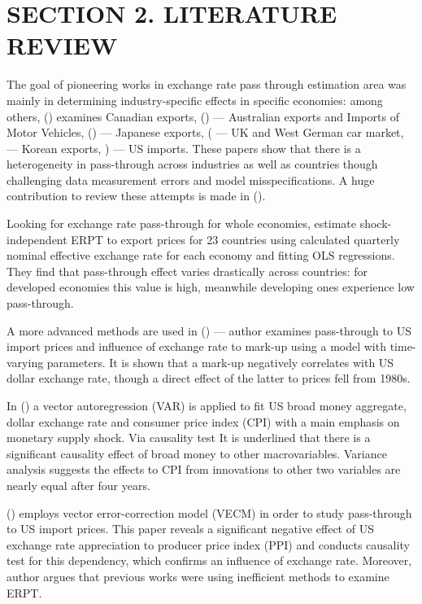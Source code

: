 \documentclass[12pt, a4paper]{extarticle}
\begin{document}
\newpage
\section*{SECTION 2. LITERATURE REVIEW}
\setcounter{section}{2}
The goal of pioneering works in exchange rate pass through estimation area was mainly in determining industry-specific effects in specific economies: among others, (\cite{Schembri1985}) examines Canadian exports, (\cite{Menon1992, Menon1993}) --- Australian exports and Imports of Motor Vehicles, (\cite{Khosla1991, Athukorala1994}) --- Japanese exports, (\cite{Cowling1989} --- UK and West German car market, \cite{Athukorala1991} --- Korean exports, \cite{Baldwin1988, Feenstra1989, Hooper1989}) --- US imports. These papers show that there is a heterogeneity in pass-through across industries as well as countries though challenging data measurement errors and model misspecifications. A huge contribution to review these attempts is made in (\cite{Menon1993, Menon1995}).

Looking for exchange rate pass-through for whole economies, \autocite{Khosla1989} estimate shock-independent ERPT to export prices for 23 countries using calculated quarterly nominal effective exchange rate for each economy and fitting OLS regressions. They find that pass-through effect varies drastically across countries: for developed economies this value is high, meanwhile developing ones experience low pass-through.

A more advanced methods are used in (\cite{Kim1990}) --- author examines pass-through to US import prices and influence of exchange rate to mark-up using a model with time-varying parameters. It is shown that a mark-up negatively correlates with US dollar exchange rate, though a direct effect of the latter to prices fell from 1980s. 

In (\cite{Deravi1995}) a vector autoregression (VAR) is applied to fit US broad money aggregate, dollar exchange rate and consumer price index (CPI) with a main emphasis on monetary supply shock. Via causality test It is underlined that there is a significant causality effect of broad money to other macrovariables. Variance analysis suggests the effects to CPI from innovations to other two variables are nearly equal after four years.
 
(\cite{Kim1998}) employs vector error-correction model (VECM) in order to study pass-through to US import prices. This paper reveals a significant negative effect of US exchange rate appreciation to producer price index (PPI) and conducts causality test for this dependency, which confirms an influence of exchange rate. Moreover, author argues that previous works were using inefficient methods to examine ERPT. 
\end{document}
